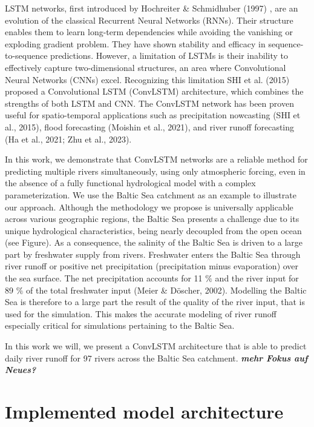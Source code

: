 \documentclass[
]{agujournal2019}
\begin{document}
LSTM networks, first introduced by Hochreiter \& Schmidhuber (1997) ,
are an evolution of the classical Recurrent Neural Networks (RNNs).
Their structure enables them to learn long-term dependencies while
avoiding the vanishing or exploding gradient problem. They have shown
stability and efficacy in sequence-to-sequence predictions. However, a
limitation of LSTMs is their inability to effectively capture
two-dimensional structures, an area where Convolutional Neural Networks
(CNNs) excel. Recognizing this limitation SHI et al. (2015) proposed a
Convolutional LSTM (ConvLSTM) architecture, which combines the strengths
of both LSTM and CNN. The ConvLSTM network has been proven useful for
spatio-temporal applications such as precipitation nowcasting (SHI et
al., 2015), flood forecasting (Moishin et al., 2021), and river runoff
forecasting (Ha et al., 2021; Zhu et al., 2023).

In this work, we demonstrate that ConvLSTM networks are a reliable
method for predicting multiple rivers simultaneously, using only
atmospheric forcing, even in the absence of a fully functional
hydrological model with a complex parameterization. We use the Baltic
Sea catchment as an example to illustrate our approach. Although the
methodology we propose is universally applicable across various
geographic regions, the Baltic Sea presents a challenge due to its
unique hydrological characteristics, being nearly decoupled from the
open ocean (see Figure). As a consequence, the salinity of the Baltic
Sea is driven to a large part by freshwater supply from rivers.
Freshwater enters the Baltic Sea through river runoff or positive net
precipitation (precipitation minus evaporation) over the sea surface.
The net precipitation accounts for 11 \(\%\) and the river input for 89
\(\%\) of the total freshwater input (Meier \& Döscher, 2002). Modelling
the Baltic Sea is therefore to a large part the result of the quality of
the river input, that is used for the simulation. This makes the
accurate modeling of river runoff especially critical for simulations
pertaining to the Baltic Sea.

In this work we will, we present a ConvLSTM architecture that is able to
predict daily river runoff for 97 rivers across the Baltic Sea
catchment. \textbf{\emph{mehr Fokus auf Neues?}}

\hypertarget{implemented-model-architecture}{%
\section{Implemented model
architecture}\label{implemented-model-architecture}}
\end{document}
